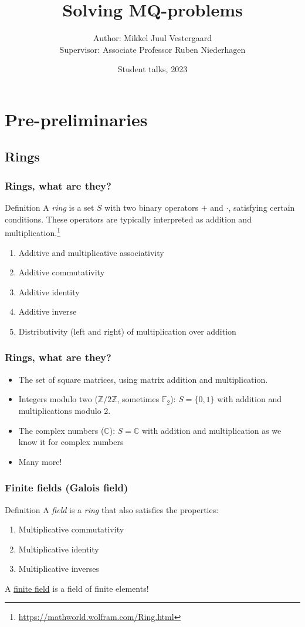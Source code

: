 \documentclass{beamer}
\title{Solving MQ-problems}
\author{Author: Mikkel Juul Vestergaard\\Supervisor: Associate Professor Ruben Niederhagen}
\institute{Department of Mathematics and Computer Science\\University of Southern Denmark}
\date{Student talks, 2023}
\begin{document}
\frame{\titlepage}

\section{Pre-preliminaries}
\subsection{Rings}
\begin{frame}
    \frametitle{Rings, what are they?}
    \begin{block}{Definition}
        A \textit{ring} is a set $S$ with two binary operators $+$ and $\cdot$, satisfying certain conditions. These operators are typically interpreted as addition and multiplication.\footnote{\url{https://mathworld.wolfram.com/Ring.html}}
        \begin{enumerate}
            \item Additive and multiplicative associativity
            \item Additive commutativity
            \item Additive identity
            \item Additive inverse
            \item Distributivity (left and right) of multiplication over addition
        \end{enumerate}
    \end{block}
\end{frame}

\begin{frame}
    \frametitle{Rings, what are they?}
    \begin{itemize}
        \item The set of square matrices, using matrix addition and multiplication.
        \item Integers modulo two ($\mathbb{Z}/2\mathbb{Z}$, sometimes $\mathbb{F}_2$): $S = \{0, 1\}$ with addition and multiplications modulo 2.
        \item The complex numbers ($\mathbb{C}$): $S = \mathbb{C}$ with addition and multiplication as we know it for complex numbers 
        \item Many more!
    \end{itemize}
\end{frame}

\begin{frame}
    \frametitle{Finite fields (Galois field)}
    \begin{block}{Definition}
        A \textit{field} is a \textit{ring} that also satisfies the properties:
        \begin{enumerate}
            \item Multiplicative commutativity
            \item Multiplicative identity
            \item Multiplicative inverses
        \end{enumerate}
    \end{block} \pause
    A \underline{finite field} is a field of finite elements!
\end{frame}
\end{document}
